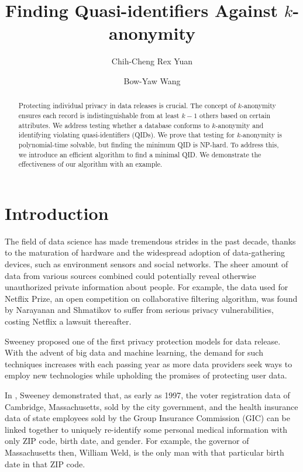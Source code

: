 \documentclass[12pt]{llncs}
\title{Finding Quasi-identifiers Against $k$-anonymity}
\author{Chih-Cheng Rex Yuan \and
        Bow-Yaw Wang}
\institute{
    Institute of Information Science, Academia Sinica, Taipei, Taiwan \\
    \email{hello@rexyuan.com, bywang@iis.sinica.edu.tw}
}
\begin{document}
\maketitle

\begin{abstract}
Protecting individual privacy in data releases is crucial. The concept of $k$-anonymity ensures each record is indistinguishable from at least $k-1$ others based on certain attributes. We address testing whether a database conforms to $k$-anonymity and identifying violating quasi-identifiers (QIDs). We prove that testing for $k$-anonymity is polynomial-time solvable, but finding the minimum QID is NP-hard. To address this, we introduce an efficient algorithm to find a minimal QID. We demonstrate the effectiveness of our algorithm with an example.
\end{abstract}

\section{Introduction}

The field of data science has made tremendous strides in the past decade, thanks to the maturation of hardware and the widespread adoption of data-gathering devices, such as environment sensors and social networks. The sheer amount of data from various sources combined could potentially reveal otherwise unauthorized private information about people. For example, the data used for Netflix Prize, an open competition on collaborative filtering algorithm, was found by Narayanan and Shmatikov \cite{Narayanan:2008} to suffer from serious privacy vulnerabilities, costing Netflix a lawsuit thereafter.

Sweeney \cite{Sweeney:2002} proposed one of the first privacy protection models for data release. With the advent of big data and machine learning, the demand for such techniques increases with each passing year as more data providers seek ways to employ new technologies while upholding the promises of protecting user data.

In \cite{Sweeney:2002}, Sweeney demonstrated that, as early as 1997, the voter registration data of Cambridge, Massachusetts, sold by the city government, and the health insurance data of state employees sold by the Group Insurance Commission (GIC) can be linked together to uniquely re-identify some personal medical information with only ZIP code, birth date, and gender. For example, the governor of Massachusetts then, William Weld, is the only man with that particular birth date in that ZIP code.
\end{document}
